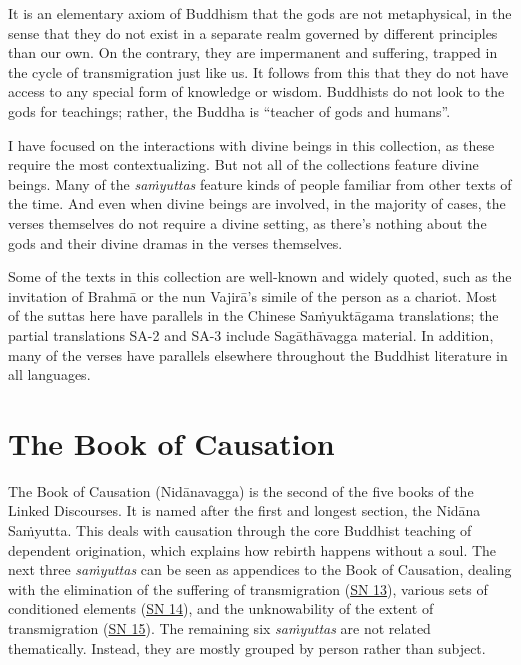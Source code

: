 \documentclass[12pt,openany]{book}%
\begin{document}
It is an elementary axiom of Buddhism that the gods are not metaphysical, in the sense that they do not exist in a separate realm governed by different principles than our own. On the contrary, they are impermanent and suffering, trapped in the cycle of transmigration just like us. It follows from this that they do not have access to any special form of knowledge or wisdom. Buddhists do not look to the gods for teachings; rather, the Buddha is “teacher of gods and humans”.

I have focused on the interactions with divine beings in this collection, as these require the most contextualizing. But not all of the collections feature divine beings. Many of the \textit{\textsanskrit{saṁyuttas}} feature kinds of people familiar from other texts of the time. And even when divine beings are involved, in the majority of cases, the verses themselves do not require a divine setting, as there’s nothing about the gods and their divine dramas in the verses themselves.

Some of the texts in this collection are well-known and widely quoted, such as the invitation of \textsanskrit{Brahmā} or the nun \textsanskrit{Vajirā}’s simile of the person as a chariot. Most of the suttas here have parallels in the Chinese \textsanskrit{Saṁyuktāgama} translations; the partial translations SA-2 and SA-3 include \textsanskrit{Sagāthāvagga} material. In addition, many of the verses have parallels elsewhere throughout the Buddhist literature in all languages.

\section*{The Book of Causation}

The Book of Causation (\textsanskrit{Nidānavagga}) is the second of the five books of the Linked Discourses. It is named after the first and longest section, the \textsanskrit{Nidāna} \textsanskrit{Saṁyutta}. This deals with causation through the core Buddhist teaching of dependent origination, which explains how rebirth happens without a soul. The next three \textit{\textsanskrit{saṁyuttas}} can be seen as appendices to the Book of Causation, dealing with the elimination of the suffering of transmigration (\href{https://suttacentral.net/sn13}{SN 13}), various sets of conditioned elements (\href{https://suttacentral.net/sn14}{SN 14}), and the unknowability of the extent of transmigration (\href{https://suttacentral.net/sn15}{SN 15}). The remaining six \textit{\textsanskrit{saṁyuttas}} are not related thematically. Instead, they are mostly grouped by person rather than subject.
\end{document}
